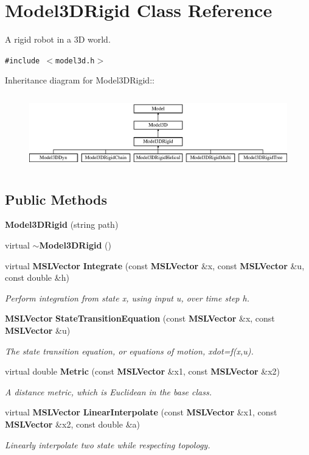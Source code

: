 \section{Model3DRigid  Class Reference}
\label{classModel3DRigid}
A rigid robot in a 3D world. 


{\tt \#include $<$model3d.h$>$}

Inheritance diagram for Model3DRigid::\begin{figure}[H]
\begin{center}
\leavevmode
\includegraphics[height=3.24638cm]{classModel3DRigid}
\end{center}
\end{figure}
\subsection*{Public Methods}
\begin{CompactItemize}
\item 
{\bf Model3DRigid} (string path)
\item 
virtual {\bf $\sim$Model3DRigid} ()
\item 
virtual {\bf MSLVector} {\bf Integrate} (const {\bf MSLVector} \&x, const {\bf MSLVector} \&u, const double \&h)
\begin{CompactList}\small\item\em Perform integration from state x, using input u, over time step h.\item\end{CompactList}\item 
{\bf MSLVector} {\bf State\-Transition\-Equation} (const {\bf MSLVector} \&x, const {\bf MSLVector} \&u)
\begin{CompactList}\small\item\em The state transition equation, or equations of motion, xdot=f(x,u).\item\end{CompactList}\item 
virtual double {\bf Metric} (const {\bf MSLVector} \&x1, const {\bf MSLVector} \&x2)
\begin{CompactList}\small\item\em A distance metric, which is Euclidean in the base class.\item\end{CompactList}\item 
virtual {\bf MSLVector} {\bf Linear\-Interpolate} (const {\bf MSLVector} \&x1, const {\bf MSLVector} \&x2, const double \&a)
\begin{CompactList}\small\item\em Linearly interpolate two state while respecting topology.\item\end{CompactList}\end{CompactItemize}


